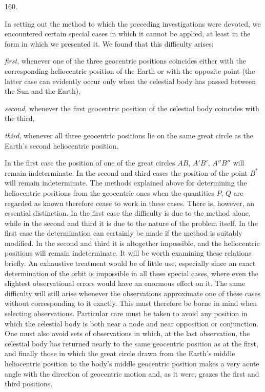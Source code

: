 \par{}\medskip
\begin{center}\hypertarget{native-222-article160}{}160.\end{center}
In setting out the method to which the preceding investigations were devoted, we encountered certain special cases in which it cannot be applied, at least in the form in which we presented it. We found that this difficulty arises:

\noindent\emph{first}, whenever one of the three geocentric positions coincides either with the corresponding heliocentric position of the Earth or with the opposite point (the latter case can evidently occur only when the celestial body has passed between the Sun and the Earth),

\noindent\emph{second}, whenever the first geocentric position of the celestial body coincides with the third,

\noindent\emph{third}, whenever all three geocentric positions lie on the same great circle as the Earth's second heliocentric position.

In the first case the position of one of the great circles $AB$, $A'B'$, $A''B''$ will remain indeterminate. In the second and third cases the position of the point $B^*$ will remain indeterminate. The methods explained above for determining the heliocentric positions from the geocentric ones when the quantities $P$, $Q$ are regarded as known therefore cease to work in these cases. There is, however, an essential distinction. In the first case the difficulty is due to the method alone, while in the second and third it is due to the nature of the problem itself. In the first case the determination can certainly be made if the method is suitably modified. In the second and third it is altogether impossible, and the heliocentric positions will remain indeterminate. It will be worth examining these relations briefly. An exhaustive treatment would be of little use, especially since an exact determination of the orbit is impossible in all these special cases, where even the slightest observational errors would have an enormous effect on it. The same difficulty will still arise whenever the observations approximate one of these cases without corresponding to it exactly. This must therefore be borne in mind when selecting observations. Particular care must be taken to avoid any position in which the celestial body is both near a node and near opposition or conjunction. One must also avoid sets of observations in which, at the last observation, the celestial body has returned nearly to the same geocentric position as at the first, and finally those in which the great circle drawn from the Earth's middle heliocentric position to the body's middle geocentric position makes a very acute angle with the direction of geocentric motion and, as it were, grazes the first and third positions.
